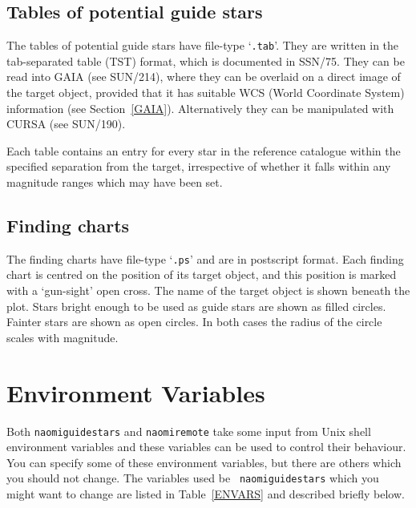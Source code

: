 \documentclass[twoside,11pt]{article}
\newcommand{\xref}[3]{#1}
\newcommand{\xlabel}[1]{}
\renewcommand{\_}{\texttt{\symbol{95}}}
\begin{document}
\subsection{Tables of potential guide stars}

The tables of potential guide stars have file-type `{\tt .tab}'.  They
are written in the tab-separated table (TST) format, which is documented
in \xref{SSN/75}{ssn75}{}\cite{SSN75}.  They can be read into GAIA
(see \xref{SUN/214}{sun214}{}\cite{SUN214}), where they can be overlaid
on a direct image of the target object, provided that it has suitable WCS
(World Coordinate System) information (see Section~\ref{GAIA}).
Alternatively they can be manipulated with CURSA (see
\xref{SUN/190}{sun190}{}\cite{SUN190}).

Each table contains an entry for every star in the reference catalogue
within the specified separation from the target, irrespective of whether
it falls within any magnitude ranges which may have been set.

\subsection{Finding charts}

The finding charts have file-type `{\tt .ps}' and are in postscript format.
Each finding chart is centred on the position of its target object, and this
position is marked with a `gun-sight' open cross.  The name of the target
object is shown beneath the plot.  Stars bright enough to be used as guide
stars are shown as filled circles.  Fainter stars are shown as open circles.
In both cases the radius of the circle scales with magnitude.  


\section{\xlabel{ENVIR}\label{ENVIR}Environment Variables}

Both {\tt naomiguidestars} and {\tt naomiremote} take some input from Unix
shell environment variables and these variables can be used to control their
behaviour.  You can specify some of these environment variables, but there
are others which you should not change.  The variables used be {\tt
naomiguidestars} which you might want to change are listed in
Table~\ref{ENVARS} and described briefly below.
\end{document}
